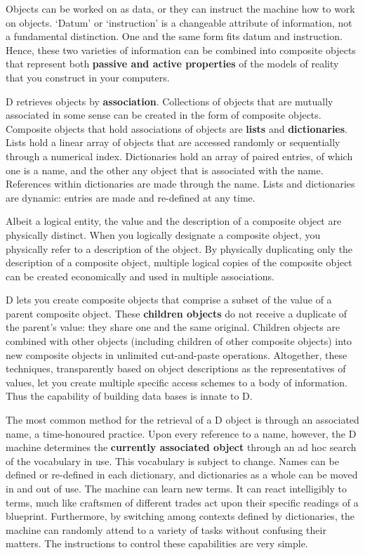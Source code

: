 Objects can be worked on as data, or they can instruct the machine how to work on objects. `Datum' or `instruction' is a changeable attribute of information,  not a fundamental  distinction. One  and the same form fits datum  and  instruction. Hence, these  two varieties of information can be combined into composite objects that represent  both \textbf{passive and active properties} of the models of reality that you construct in your computers.

D  retrieves  objects by \textbf{association}.  Collections of objects  that  are mutually associated in some sense can be created in the form of composite objects.  Composite  objects that hold associations of objects are  \textbf{lists} and  \textbf{dictionaries}.  Lists  hold  a linear array of objects  that  are  accessed randomly or sequentially through a numerical index.  Dictionaries hold an array of paired entries, of which one is a name, and the other any object that is associated with the name.  References within  dictionaries are made through the name.  Lists and dictionaries are dynamic:  entries are  made and re-defined at any time.

Albeit  a logical entity,  the value and the description of a  composite object are physically distinct.  When you logically designate a composite object,  you  physically  refer  to  a  description  of  the  object.  By physically  duplicating  only  the description  of  a  composite  object, multiple   logical  copies  of  the  composite  object  can  be   created economically and used in multiple associations.

D  lets you create composite objects that comprise a subset  of  the value of a parent composite object. These \textbf{children objects} do not receive a duplicate of the parent's value:  they share one and the same original. Children  objects are combined with other objects (including children  of other composite objects) into new composite objects in unlimited cut-and-paste operations.  Altogether,  these techniques,  transparently based on object  descriptions  as the representatives of values,  let  you  create multiple specific access schemes to a body of information. Thus the capability of building data bases is innate to D.

The  most  common method for the retrieval of a D object is  through  an associated  name,  a time-honoured practice.  Upon every reference  to  a name,  however,  the D machine determines the \textbf{currently associated object} through  an ad hoc search of the vocabulary in use.  This  vocabulary  is subject to change. Names can be defined or re-defined in each dictionary, and  dictionaries as a whole can be moved in and out of  use.  The machine  can  learn new  terms. It can react intelligibly to terms, much like craftsmen of different trades act upon their specific readings of a blueprint.  Furthermore,  by switching among contexts defined by dictionaries, the machine can randomly attend to a variety of tasks without confusing their matters.  The instructions to  control  these capabilities are very simple. 

